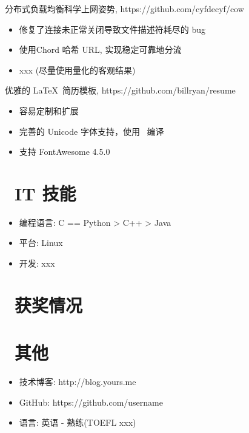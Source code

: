 \documentclass{resume}
\begin{document}
\begin{onehalfspacing}
分布式负载均衡科学上网姿势, https://github.com/cyfdecyf/cow
\begin{itemize}
  \item 修复了连接未正常关闭导致文件描述符耗尽的 bug
  \item 使用Chord 哈希 URL, 实现稳定可靠地分流
  \item xxx (尽量使用量化的客观结果)
\end{itemize}
\end{onehalfspacing}

\begin{onehalfspacing}
优雅的 \LaTeX\ 简历模板, https://github.com/billryan/resume
\begin{itemize}
  \item 容易定制和扩展
  \item 完善的 Unicode 字体支持，使用 \XeLaTeX\ 编译
  \item 支持 FontAwesome 4.5.0
\end{itemize}
\end{onehalfspacing}


\section{\faCogs\ IT 技能}
\begin{itemize}[parsep=0.5ex]
  \item 编程语言: C == Python > C++ > Java
  \item 平台: Linux
  \item 开发: xxx
\end{itemize}

\section{\faHeartO\ 获奖情况}

\section{\faInfo\ 其他}
\begin{itemize}[parsep=0.5ex]
  \item 技术博客: http://blog.yours.me
  \item GitHub: https://github.com/username
  \item 语言: 英语 - 熟练(TOEFL xxx)
\end{itemize}

%
%
\end{document}
